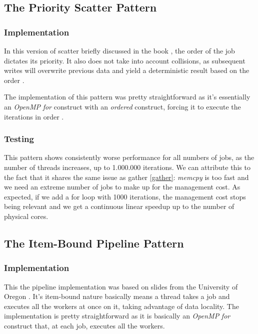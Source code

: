 \documentclass[10pt,journal]{IEEEtran}
\begin{document}
\subsection{The Priority Scatter Pattern}
\subsubsection{Implementation}

In this version of scatter briefly discussed in the book \cite{mccool}, the order of the job dictates its priority. It also does not take into account collisions, as subsequent writes will overwrite previous data and yield a deterministic result based on the order \cite{mccool}.

The implementation of this pattern was pretty straightforward as it's essentially an \textit{OpenMP} \textit{for} construct with an \textit{ordered} construct, forcing it to execute the iterations in order \cite{omporder}.

\subsubsection{Testing}

This pattern shows consistently worse performance for all numbers of jobs, as the number of threads increases, up to 1.000.000 iterations. We can attribute this to the fact that it shares the same issue as gather \ref{gather}: \textit{memcpy} is too fast and we need an extreme number of jobs to make up for the management cost. As expected, if we add a for loop with 1000 iterations, the management cost stops being relevant and we get a continuous linear speedup up to the number of physical cores. 

\subsection{The Item-Bound Pipeline Pattern}
\label{itembound}

\subsubsection{Implementation}

This the pipeline implementation was based on slides from the University of Oregon \cite{pipelineoregon}. It's item-bound nature basically means a thread takes a job and executes all the workers at once on it, taking advantage of data locality. The implementation is pretty straightforward as it is basically an \textit{OpenMP} \textit{for} construct that, at each job, executes all the workers.
\end{document}
